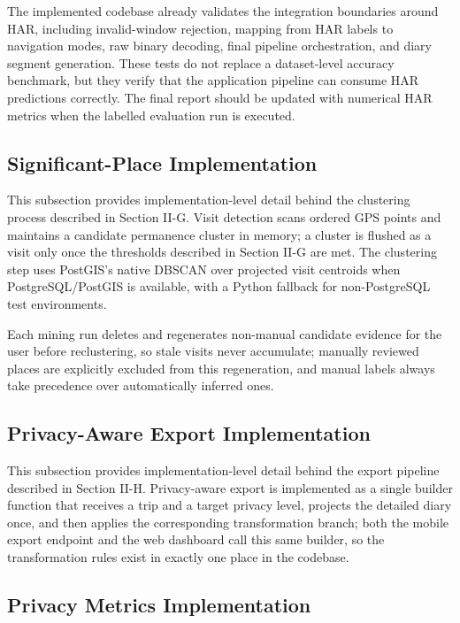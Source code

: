 \documentclass[conference,a4paper]{IEEEtran}
\begin{document}
The implemented codebase already validates the integration boundaries around HAR, including invalid-window rejection, mapping from HAR labels to navigation modes, raw binary decoding, final pipeline orchestration, and diary segment generation. These tests do not replace a dataset-level accuracy benchmark, but they verify that the application pipeline can consume HAR predictions correctly. The final report should be updated with numerical HAR metrics when the labelled evaluation run is executed.

\subsection{Significant-Place Implementation}

This subsection provides implementation-level detail behind the clustering process described in Section II-G. Visit detection scans ordered GPS points and maintains a candidate permanence cluster in memory; a cluster is flushed as a visit only once the thresholds described in Section II-G are met. The clustering step uses PostGIS's native DBSCAN over projected visit centroids when PostgreSQL/PostGIS is available, with a Python fallback for non-PostgreSQL test environments.

Each mining run deletes and regenerates non-manual candidate evidence for the user before reclustering, so stale visits never accumulate; manually reviewed places are explicitly excluded from this regeneration, and manual labels always take precedence over automatically inferred ones.

\subsection{Privacy-Aware Export Implementation}

This subsection provides implementation-level detail behind the export pipeline described in Section II-H. Privacy-aware export is implemented as a single builder function that receives a trip and a target privacy level, projects the detailed diary once, and then applies the corresponding transformation branch; both the mobile export endpoint and the web dashboard call this same builder, so the transformation rules exist in exactly one place in the codebase.

\subsection{Privacy Metrics Implementation}
\end{document}
